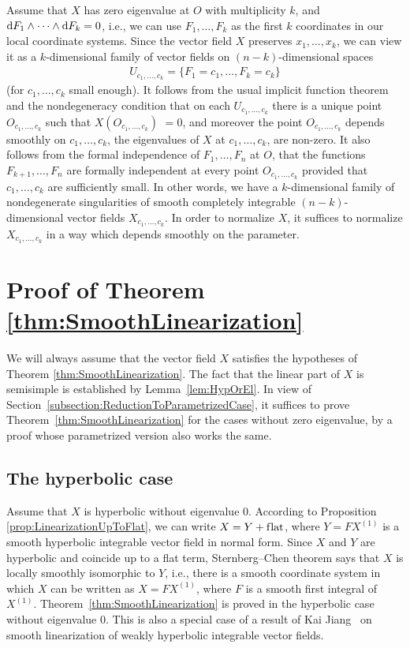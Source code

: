 Assume that $X$ has zero eigenvalue at $O$ with multiplicity $k$, and ${\rm d}F_1 \wedge \dots \wedge {\rm d}F_k = 0$,
i.e., we can use $F_1,\dots,F_k$ as the f\/irst $k$ coordinates in our local coordinate systems. Since
the vector f\/ield $X$ preserves $x_1,\dots,x_k$, we can view it as a $k$-dimensional family of vector f\/ields
on $(n-k)$-dimensional spaces
\begin{gather*}
 U_{c_1,\dots,c_k} = \{F_1 = c_1, \dots, F_k = c_k\}
\end{gather*}
(for $c_1,\dots,c_k$ small enough). It follows from the
usual implicit function theorem and the nondegeneracy condition
that on each $U_{c_1,\dots,c_k}$ there is a unique
point $O_{c_1,\dots,c_k}$ such that $X(O_{c_1,\dots,c_k})$ $= 0$, and moreover the point $O_{c_1,\dots,c_k}$
depends smoothly on $c_1,\dots,c_k$, the eigenvalues of $X$ at $c_1,\dots,c_k$, are non-zero.
It also follows from the formal independence of $F_1,\dots,F_n$ at $O$, that the
functions $F_{k+1},\dots,F_n$ are formally independent at every point $O_{c_1,\dots,c_k}$ provided
that $c_1,\dots,c_k$ are suf\/f\/iciently small. In other words, we have a $k$-dimensional family of nondegenerate
singularities of smooth completely integrable $(n-k)$-dimensional vector f\/ields $X_{c_1,\dots,c_k}$.
In order to normalize $X$, it suf\/f\/ices to normalize $X_{c_1,\dots,c_k}$ in a way which depends smoothly
on the parameter.

\section{Proof of Theorem \ref{thm:SmoothLinearization}}\label{section3}

We will always assume that the vector f\/ield
$X$ satisf\/ies the hypotheses of Theorem \ref{thm:SmoothLinearization}.
The fact that the linear part of $X$ is semisimple is established by Lemma~\ref{lem:HypOrEl}.
In view of Section~\ref{subsection:ReductionToParametrizedCase}, it suf\/f\/ices to prove
Theorem~\ref{thm:SmoothLinearization} for the cases without zero eigenvalue, by a proof whose
parametrized version also works the same.

\subsection{The hyperbolic case} Assume that $X$ is hyperbolic without eigenvalue 0.
According to Proposition \ref{prop:LinearizationUpToFlat}, we can write $X = Y + \text{f\/lat}$,
where $Y = FX^{(1)}$ is a smooth hyperbolic integrable vector f\/ield in normal form. Since
$X$ and $Y$ are hyperbolic and coincide up to a f\/lat term, Sternberg--Chen theorem
\cite{Chen-Vector1963, Sternberg} says that $X$ is locally smoothly isomorphic to $Y$, i.e.,
there is a smooth coordinate system in which $X$ can be written as $X = F X^{(1)}$, where $F$
is a smooth f\/irst integral of~$X^{(1)}$. Theorem~\ref{thm:SmoothLinearization} is proved in the
hyperbolic case without eigenvalue 0. This is also a special case
of a result of Kai Jiang~\cite{Jiang-WeakHyp2016} on smooth linearization of
weakly hyperbolic integrable vector f\/ields.

